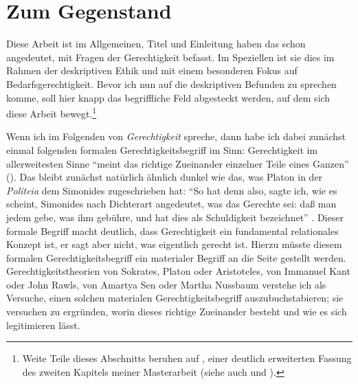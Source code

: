 \documentclass[justified,nobib,symmetric,twoside]{tufte-handout}
\begin{document}
\section{Zum Gegenstand}\label{sec:gegenstand}
Diese Arbeit ist im Allgemeinen, Titel und Einleitung haben das schon angedeutet, mit Fragen der Gerechtigkeit befasst.
Im Speziellen ist sie dies im Rahmen der deskriptiven Ethik und mit einem besonderen Fokus auf Bedarfsgerechtigkeit.
Bevor ich nun auf die deskriptiven Befunden zu sprechen komme, soll hier knapp das begriffliche Feld abgesteckt werden, auf dem sich diese Arbeit bewegt.\footnote[][-0.1cm]{Weite Teile dieses Abschnitts beruhen auf \citet{bauer_gerechtigkeit_2019}, einer deutlich erweiterten Fassung des zweiten Kapitels meiner Masterarbeit (siehe auch \cite{bauer_monotonie_2018} und \cite{bauer_grundlegung_2019}).}

Wenn ich im Folgenden von \textit{Gerechtigkeit} spreche, dann habe ich dabei zunächst einmal folgenden formalen Gerechtigkeitsbegriff im Sinn: Gerechtigkeit im allerweitesten Sinne \enquote{meint das richtige Zueinander einzelner Teile eines Ganzen} (\cite[S.~289]{bauer_gerechtigkeit_2019}).
Das bleibt zunächst natürlich ähnlich dunkel wie das, was Platon in der \textit{Politeia} dem Simonides zugeschrieben hat: \enquote{So hat denn also, sagte ich, wie es scheint, Simonides nach Dichterart angedeutet, was das Gerechte sei: daß man jedem gebe, was ihm gebühre, und hat dies als Schuldigkeit bezeichnet} \citep[S.~13, 332\,b--c]{platon_staat_2004}.
Dieser formale Begriff macht deutlich, dass Gerechtigkeit ein fundamental relationales Konzept ist, er sagt aber nicht, was eigentlich gerecht ist.
Hierzu müsste diesem formalen Gerechtigkeitsbegriff ein materialer Begriff an die Seite gestellt werden.
Gerechtigkeitstheorien von Sokrates, Platon oder Aristoteles, von Immanuel Kant oder John Rawls, von Amartya Sen oder Martha Nussbaum verstehe ich als Versuche, einen solchen materialen Gerechtigkeitsbegriff auszubuchstabieren; sie versuchen zu ergründen, worin dieses richtige Zueinander besteht und wie es sich legitimieren lässt.
\end{document}
